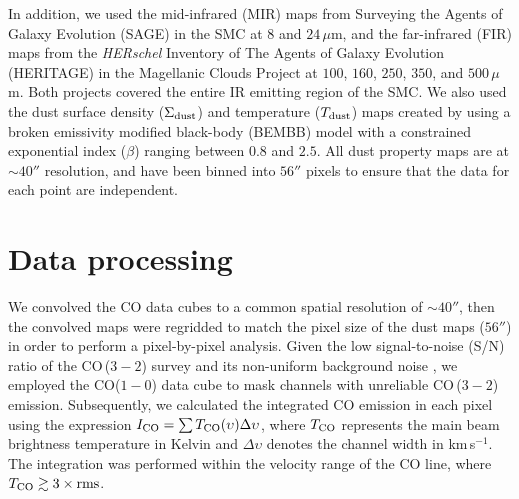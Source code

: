 \documentclass[baaa]{baaa}
\begin{document}

In addition, we used the mid-infrared (MIR) maps from Surveying the Agents of Galaxy Evolution (SAGE) in the SMC \citep{Gordon_2011_AJ_142_102G} at $8$ and $24\,\mu$m, and the far-infrared (FIR) maps from the {\it HERschel} Inventory of The Agents of Galaxy Evolution (HERITAGE) in the Magellanic Clouds Project \citep{Meixner_2013AJ_146_62M} at $100$, $160$, $250$, $350$, and $500\,\mu$m. Both projects covered the entire IR emitting region of the SMC. We also used the dust surface density ($\Sigma_{\rm dust}$) and temperature ($T_{\rm dust}$) maps created by \cite{Gordon_2014_ApJ_797_85G} using a broken emissivity modified black-body (BEMBB) model with a constrained exponential index ($\beta$) ranging between $0.8$ and $2.5$. All dust property maps are at $\sim 40''$ resolution, and have been binned into $56''$ pixels to ensure that the data for each point are independent.

\section{Data processing}
\label{sec:metodology}

We convolved the CO data cubes to a common spatial resolution of $\sim 40''$, then the convolved maps were regridded to match the pixel size of the dust maps ($56''$) in order to perform a pixel-by-pixel analysis. Given the low signal-to-noise (S/N) ratio of the CO\,($3-2$) survey and its non-uniform background noise \citep[see][]{Saldanio_2024_AA_687A_26S}, we employed the CO($1-0$) data cube \citep{Mizuno_2009IAUS_256_203M} to mask channels with unreliable CO\,($3-2$) emission. Subsequently, we calculated the integrated CO emission in each pixel using the expression $I_{{\rm CO}} = \sum T_{{\rm CO}}(\upsilon)\Delta\upsilon$, where $T_{{\rm CO}}$ represents the main beam brightness temperature in Kelvin and $\Delta\upsilon$ denotes the channel width in km\,s$^{-1}$. The integration was performed within the velocity range of the CO line, where $T_{{\rm CO}} \gtrsim 3\times {\rm rms}$.
\end{document}
